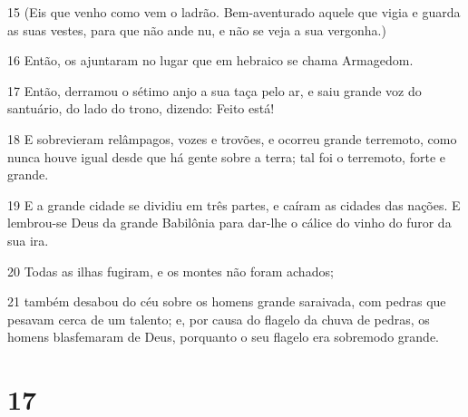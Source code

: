 \par 15 (Eis que venho como vem o ladrão. Bem-aventurado aquele que vigia e guarda as suas vestes, para que não ande nu, e não se veja a sua vergonha.)
\par 16 Então, os ajuntaram no lugar que em hebraico se chama Armagedom.
\par 17 Então, derramou o sétimo anjo a sua taça pelo ar, e saiu grande voz do santuário, do lado do trono, dizendo: Feito está!
\par 18 E sobrevieram relâmpagos, vozes e trovões, e ocorreu grande terremoto, como nunca houve igual desde que há gente sobre a terra; tal foi o terremoto, forte e grande.
\par 19 E a grande cidade se dividiu em três partes, e caíram as cidades das nações. E lembrou-se Deus da grande Babilônia para dar-lhe o cálice do vinho do furor da sua ira.
\par 20 Todas as ilhas fugiram, e os montes não foram achados;
\par 21 também desabou do céu sobre os homens grande saraivada, com pedras que pesavam cerca de um talento; e, por causa do flagelo da chuva de pedras, os homens blasfemaram de Deus, porquanto o seu flagelo era sobremodo grande.

\chapter{17}

